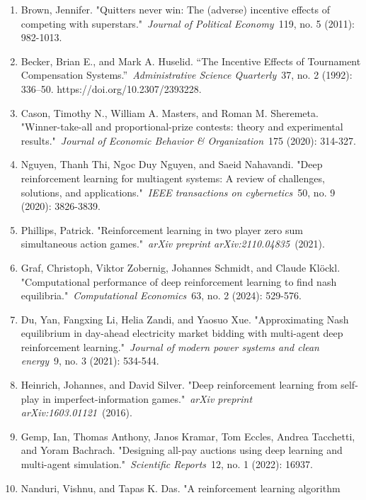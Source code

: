 \documentclass[
]{article}
\begin{document}
\begin{enumerate}
  Knauer, Thorsten, Friedrich Sommer, and Arnt Wöhrmann. "Tournament
  winner proportion and its effect on effort: An investigation of the
  underlying psychological mechanisms."~\emph{European Accounting
  Review}~26, no. 4 (2017): 681-702.
\item
  Brown, Jennifer. "Quitters never win: The (adverse) incentive effects
  of competing with superstars."~\emph{Journal of Political
  Economy}~119, no. 5 (2011): 982-1013.
\item
  Becker, Brian E., and Mark A. Huselid. ``The Incentive Effects of
  Tournament Compensation Systems.''~\emph{Administrative Science
  Quarterly}~37, no. 2 (1992): 336--50. https://doi.org/10.2307/2393228.
\item
  Cason, Timothy N., William A. Masters, and Roman M. Sheremeta.
  "Winner-take-all and proportional-prize contests: theory and
  experimental results."~\emph{Journal of Economic Behavior \&
  Organization}~175 (2020): 314-327.
\item
  Nguyen, Thanh Thi, Ngoc Duy Nguyen, and Saeid Nahavandi. "Deep
  reinforcement learning for multiagent systems: A review of challenges,
  solutions, and applications."~\emph{IEEE transactions on
  cybernetics}~50, no. 9 (2020): 3826-3839.
\item
  Phillips, Patrick. "Reinforcement learning in two player zero sum
  simultaneous action games."~\emph{arXiv preprint
  arXiv:2110.04835}~(2021).
\item
  Graf, Christoph, Viktor Zobernig, Johannes Schmidt, and Claude Klöckl.
  "Computational performance of deep reinforcement learning to find nash
  equilibria."~\emph{Computational Economics}~63, no. 2 (2024): 529-576.
\item
  Du, Yan, Fangxing Li, Helia Zandi, and Yaosuo Xue. "Approximating Nash
  equilibrium in day-ahead electricity market bidding with multi-agent
  deep reinforcement learning."~\emph{Journal of modern power systems
  and clean energy}~9, no. 3 (2021): 534-544.
\item
  Heinrich, Johannes, and David Silver. "Deep reinforcement learning
  from self-play in imperfect-information games."~\emph{arXiv preprint
  arXiv:1603.01121}~(2016).
\item
  Gemp, Ian, Thomas Anthony, Janos Kramar, Tom Eccles, Andrea Tacchetti,
  and Yoram Bachrach. "Designing all-pay auctions using deep learning
  and multi-agent simulation."~\emph{Scientific Reports}~12, no. 1
  (2022): 16937.
\item
  Nanduri, Vishnu, and Tapas K. Das. "A reinforcement learning algorithm

\end{enumerate}
\end{document}

